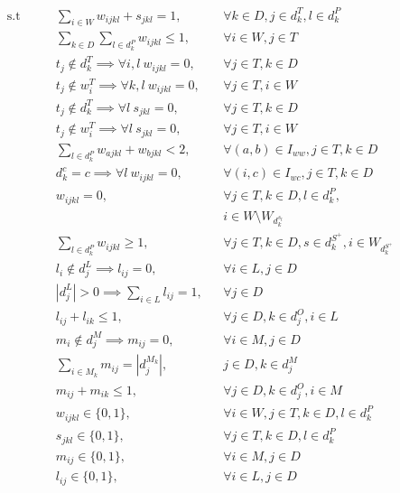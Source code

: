 \documentclass[../../thesis.tex]{subfiles}
\begin{document}
\begin{align*}
    \textrm{s.t} \qquad & \sum_{i \in W} w_{ijkl} + s_{jkl} = 1, && \forall k \in D, j \in d_k^T, l \in d_k^P \\
    & \sum_{k \in D} \sum_{l \in d_k^P} w_{ijkl} \leq 1, && \forall i \in W, j \in T  \\
    & t_j \notin d^T_{k} \implies \forall i, l \ w_{ijkl} = 0,  && \forall j \in T , k \in D \\
    & t_j \notin w^T_{i} \implies \forall k, l \ w_{ijkl} = 0, && \forall j \in T, i \in W  \\ 
    & t_j \notin d^T_{k} \implies \forall l \ s_{jkl} = 0,  && \forall j \in T , k \in D  \\
    & t_j \notin w^T_{i} \implies \forall l \ s_{jkl} = 0, && \forall j \in T, i \in W  \\ 
    & \sum_{l \in d^P_k} w_{ajkl} + w_{bjkl} < 2, &&  \forall {(a, b) \in I_{ww}}, j \in T, k \in D \\
    & d^c_{k} = c \implies \forall l \ w_{ijkl} = 0, && \forall {(i, c) \in I_{wc}}, j \in T, k \in D  \\ 
    & w_{ijkl} = 0, && \forall j \in T, k \in D, l \in d^P_k,  \\
    & && i \in W \setminus W_{d^{s_l}_k} \\
    & \sum_{l \in d_k^P} w_{ijkl} \geq 1, && \forall j \in T, k \in D, s \in d^{S^+}_k, i \in W_{d^{S^+}_k}  \\
    & l_i \notin d^L_j \implies l_{ij} = 0, && \forall i \in L, j \in D   \\
    & |d^L_j| > 0 \implies \sum_{i \in L} l_{ij} = 1, && \forall j \in D \\
    & l_{ij} + l_{ik} \leq 1, && \forall j \in D, k \in d^O_j, i \in L \\
    & m_i \notin d^M_j \implies m_{ij} = 0, && \forall i \in M, j \in D   \\
    & \sum_{i \in M_k} m_{ij} = |d^{M_k}_j|, && j \in D, k \in d^M_j  \\
    & m_{ij} + m_{ik} \leq 1, && \forall j \in D, k \in d^O_j, i \in M  \\
    & w_{ijkl} \in \{0, 1\}, && \forall i \in W, j \in T, k \in D, l \in d^P_k  \\
    & s_{jkl} \in \{0, 1\}, && \forall j \in T, k \in D, l \in d^P_k  \\
    & m_{ij} \in \{0, 1\}, && \forall i \in M, j \in D  \\ 
    & l_{ij} \in \{0, 1\}, && \forall i \in L, j \in D  
\end{align*}
\endgroup
\end{document}
